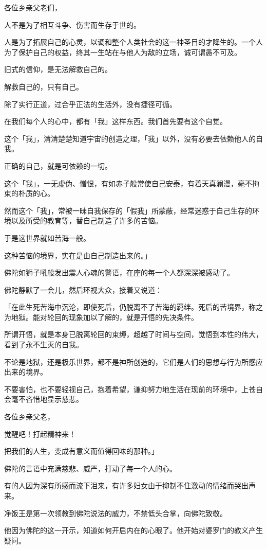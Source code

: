 \documentclass[twoside,openany]{book}
\begin{document}
各位乡亲父老们，

人不是为了相互斗争、伤害而生存于世的。

人是为了拓展自己的心灵，以调和整个人类社会的这一神圣目的才降生的。一个人为了保护自己的权益，终其一生站在与他人为敌的立场，诚可谓愚不可及。

旧式的信仰，是无法解救自己的。

解救自己的，只有自己。

除了实行正道，过合乎正法的生活外，没有捷径可循。

在我们每个人的心中，都有「我」这样东西。我们首先要有这个自觉。

这个「我」，清清楚楚知道宇宙的创造之理，「我」以外，没有必要去依赖他人的自我。

正确的自己，就是可依赖的一切。

这个「我」，一无虚伪、憎恨，有如赤子般常使自己安泰，有着天真澜漫，毫不拘束的朴质的心。

然而这个「我」，常被一昧自我保存的「假我」所蒙蔽，经常迷惑于自己生存的环境以及所受的教育等，替自己制造了许多的苦恼。

于是这世界就如苦海一般。

这种苦恼的境界，实在是由自己制造出来的。」

佛陀如狮子吼般发出震人心魂的警语，在座的每一个人都深深被感动了。

佛陀静默了一会儿，然后环视大众，接着又说道：

「在此生死苦海中沉沦，即使死后，仍脱离不了苦海的羁绊。死后的苦境界，称之为地狱。能对轮回的现象加以了解的，就是开悟的先决条件。

所谓开悟，就是本身已脱离轮回的束缚，超越了时间与空间，觉悟到本性的伟大，看到了永不生灭的自我。

不论是地狱，还是极乐世界，都不是神所创造的，它们是人们的思想与行为所感应出来的境界。

不要害怕，也不要轻视自己，抱着希望，谦抑努力地生活在现前的环境中，上苍自会毫不吝惜地显示慈悲。

各位乡亲父老，

觉醒吧！打起精神来！

把我们的人生，变成有意义而值得回味的那种。」

佛陀的言语中充满慈悲、威严，打动了每一个人的心。

有的人因为深有所感而流下泪来，有许多妇女由于抑制不住激动的情绪而哭出声来。

净饭王是第一次领教到佛陀说法的威力，不禁低头合掌，向佛陀致敬。

他因为佛陀的这一开示，知道如何开启内在的心眼了。他开始对婆罗门的教义产生疑问。
\end{document}
